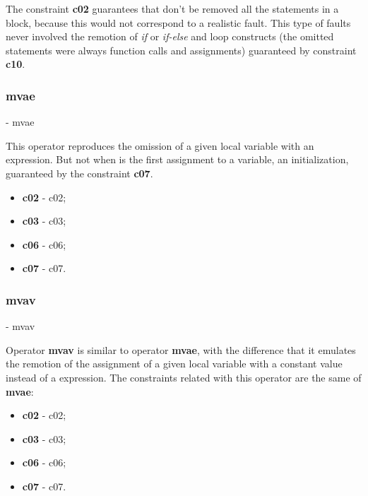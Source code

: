 	The constraint \textbf{\ac{c02}} guarantees that don't be removed all the statements in a block, because this would not correspond to a realistic fault. This type of faults never involved the remotion of \textit{if} or \textit{if-else} and loop constructs (the omitted statements were always function calls and assignments) guaranteed by constraint \textbf{\ac{c10}}.

	\subsubsection{\textbf{\acs{mvae}}} - \Acl{mvae}
	\hypertarget{mvae}{}

	This operator reproduces the omission of a given local variable with an expression. But not when is the first assignment to a variable, an initialization, guaranteed by the constraint \textbf{\acs{c07}}.

	\begin{itemize}
		\item \textbf{\acs{c02}} - \Acl{c02};
		\item \textbf{\acs{c03}} - \Acl{c03};
		\item \textbf{\acs{c06}} - \Acl{c06};
		\item \textbf{\acs{c07}} - \Acl{c07}.
	\end{itemize}

	\subsubsection{\textbf{\acs{mvav}}} - \Acl{mvav}
	\hypertarget{mvav}{}

	Operator \textbf{\ac{mvav}} is similar to operator \textbf{\ac{mvae}}, with the difference that it emulates the remotion of the assignment of a given local variable with a constant value instead of a expression. The constraints related with this operator are the same of \textbf{\ac{mvae}}:

	\begin{itemize}
		\item \textbf{\acs{c02}} - \Acl{c02};
		\item \textbf{\acs{c03}} - \Acl{c03};
		\item \textbf{\acs{c06}} - \Acl{c06};
		\item \textbf{\acs{c07}} - \Acl{c07}.
	\end{itemize}


